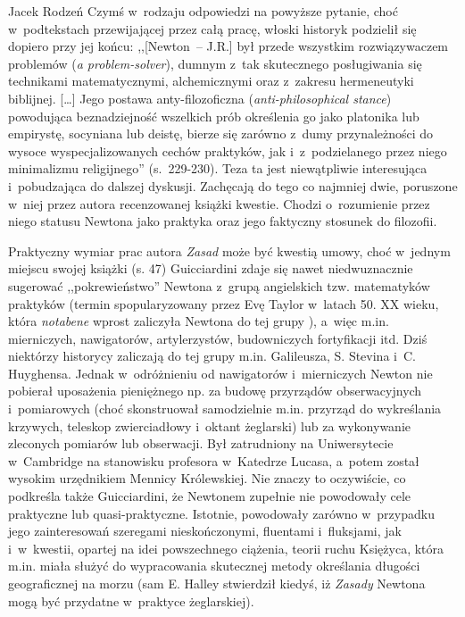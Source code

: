 \begin{recplenv}{Jacek Rodzeń}
Czymś w~rodzaju odpowiedzi na powyższe pytanie, choć w~podtekstach przewijającej przez całą pracę, włoski historyk
podzielił się dopiero przy jej końcu: ,,[Newton~-- J.R.] był przede wszystkim rozwiązywaczem problemów (\textit{a
problem-solver}), dumnym z~tak skutecznego posługiwania się technikami matematycznymi, alchemicznymi oraz z~zakresu
hermeneutyki biblijnej. […] Jego postawa anty-filozoficzna (\textit{anti-philosophical stance}) powodująca
beznadziejność wszelkich prób określenia go jako platonika lub empirystę, socyniana lub deistę, bierze się
zarówno z~dumy przynależności do wysoce wyspecjalizowanych cechów praktyków, jak i~z~podzielanego przez niego minimalizmu
religijnego'' (s.~229-230). Teza ta jest niewątpliwie interesująca i~pobudzająca do dalszej dyskusji. Zachęcają do tego
co najmniej dwie, poruszone w~niej przez autora recenzowanej książki kwestie. Chodzi o~rozumienie przez niego statusu
Newtona jako praktyka oraz jego faktyczny stosunek do filozofii. 

Praktyczny wymiar prac autora \textit{Zasad} może być kwestią umowy, choć w~jednym miejscu swojej książki (s. 47)
Guicciardini zdaje się nawet niedwuznacznie sugerować ,,pokrewieństwo'' Newtona z~grupą angielskich tzw. matematyków
praktyków (termin spopularyzowany przez Evę Taylor w~latach 50. XX wieku, która \textit{notabene} wprost zaliczyła
Newtona do tej grupy \parencite[zob.][]{taylor_mathematical_1954}), a~więc m.in. mierniczych, nawigatorów, artylerzystów, budowniczych fortyfikacji itd. Dziś
niektórzy historycy zaliczają do tej grupy m.in. Galileusza, S. Stevina i~C. Huyghensa. Jednak w~odróżnieniu od
nawigatorów i~mierniczych Newton nie pobierał uposażenia pieniężnego np. za budowę przyrządów
obserwacyjnych i~pomiarowych (choć skonstruował samodzielnie m.in. przyrząd do wykreślania krzywych,
teleskop zwierciadłowy i~oktant
żeglarski) lub za wykonywanie zleconych pomiarów lub obserwacji. Był zatrudniony na Uniwersytecie w~Cambridge na
stanowisku profesora w~Katedrze Lucasa, a~potem został wysokim urzędnikiem Mennicy Królewskiej. Nie znaczy to
oczywiście, co podkreśla także Guicciardini, że Newtonem zupełnie nie powodowały cele praktyczne lub quasi-praktyczne.
Istotnie, powodowały zarówno w~przypadku jego zainteresowań szeregami nieskończonymi, fluentami i~fluksjami,
jak i~w~kwestii, opartej na idei powszechnego ciążenia, teorii ruchu Księżyca, która m.in. miała służyć do wypracowania
skutecznej metody określania długości geograficznej na morzu (sam E. Halley stwierdził kiedyś, iż \textit{Zasady}
Newtona mogą być przydatne w~praktyce żeglarskiej).


\end{recplenv}

